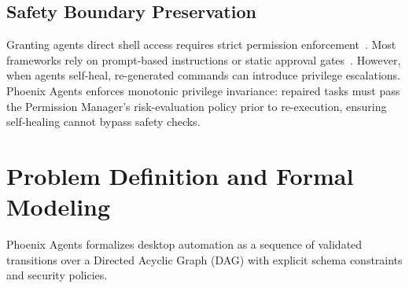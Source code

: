 \documentclass[conference]{IEEEtran}
\begin{document}
\subsection{Safety Boundary Preservation}
Granting agents direct shell access requires strict permission enforcement~\cite{bajoria2026}. Most frameworks rely on prompt-based instructions or static approval gates~\cite{wu2024}. However, when agents self-heal, re-generated commands can introduce privilege escalations. Phoenix Agents enforces monotonic privilege invariance: repaired tasks must pass the Permission Manager's risk-evaluation policy prior to re-execution, ensuring self-healing cannot bypass safety checks.

\section{Problem Definition and Formal Modeling}

Phoenix Agents formalizes desktop automation as a sequence of validated transitions over a Directed Acyclic Graph (DAG) with explicit schema constraints and security policies.
\end{document}
